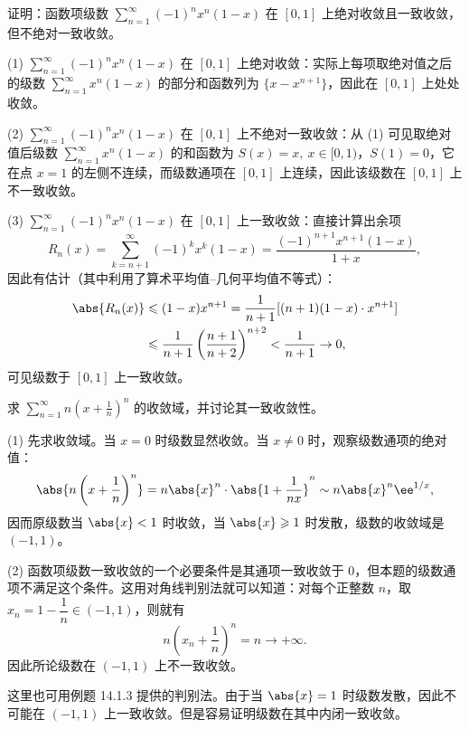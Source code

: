 \begin{xexample}[14.1.5]
证明：函数项级数 $\displaystyle\sum_{n=1}^{\infty}(-1)^n x^n(1-x)$ 在 $[0,1]$ 上绝对收敛且一致收敛，但不绝对一致收敛。
\end{xexample}
\begin{xproof}
(1) $\displaystyle\sum_{n=1}^{\infty}(-1)^n x^n(1-x)$ 在 $[0,1]$ 上绝对收敛：实际上每项取绝对值之后的级数 $\displaystyle\sum_{n=1}^{\infty}x^n(1-x)$ 的部分和函数列为 $\{x-x^{n+1}\}$，因此在 $[0,1]$ 上处处收敛。

(2) $\displaystyle\sum_{n=1}^{\infty}(-1)^n x^n(1-x)$ 在 $[0,1]$ 上不绝对一致收敛：从 (1) 可见取绝对值后级数 $\displaystyle\sum_{n=1}^{\infty}x^n(1-x)$ 的和函数为 $S(x)=x,\ x\in[0,1)$，$S(1)=0$，它在点 $x=1$ 的左侧不连续，而级数通项在 $[0,1]$ 上连续，因此该级数在 $[0,1]$ 上不一致收敛。

(3) $\displaystyle\sum_{n=1}^{\infty}(-1)^n x^n(1-x)$ 在 $[0,1]$ 上一致收敛：直接计算出余项
\[
  R_n(x)=\sum_{k=n+1}^{\infty}(-1)^k x^k(1-x)=\frac{(-1)^{n+1}x^{n+1}(1-x)}{1+x},
\]
因此有估计（其中利用了算术平均值--几何平均值不等式）：
\[
\begin{aligned}
  \abs{R_n(x)}&\leqslant(1-x)x^{n+1}
  =\frac1{n+1}[(n+1)(1-x)\cdot x^{n+1}]\\
  &\leqslant\frac1{n+1}\left(\frac{n+1}{n+2}\right)^{n+2}
  <\frac1{n+1}\to0,
\end{aligned}
\]
可见级数于 $[0,1]$ 上一致收敛。
\end{xproof}

\begin{xexample}[14.1.6]
求 $\displaystyle\sum_{n=1}^{\infty}n\left(x+\frac1n\right)^n$ 的收敛域，并讨论其一致收敛性。
\end{xexample}
\begin{xsolution}
(1) 先求收敛域。当 $x=0$ 时级数显然收敛。当 $x\ne0$ 时，观察级数通项的绝对值：
\[
  \abs{n\left(x+\frac1n\right)^n}
  =n\abs{x}^n\cdot\abs{1+\frac1{nx}}^n\sim n\abs{x}^n\ee^{1/x},
\]
因而原级数当 $\abs{x}<1$ 时收敛，当 $\abs{x}\geqslant1$ 时发散，级数的收敛域是 $(-1,1)$。

(2) 函数项级数一致收敛的一个必要条件是其通项一致收敛于 $0$，但本题的级数通项不满足这个条件。这用对角线判别法就可以知道：对每个正整数 $n$，取 $x_n=1-\dfrac1n\in(-1,1)$，则就有
\[
  n\left(x_n+\frac1n\right)^n=n\to+\infty.
\]
因此所论级数在 $(-1,1)$ 上不一致收敛。
\end{xsolution}

\begin{xremark}
这里也可用例题 14.1.3 提供的判别法。由于当 $\abs{x}=1$ 时级数发散，因此不可能在 $(-1,1)$ 上一致收敛。但是容易证明级数在其中内闭一致收敛。
\end{xremark}

